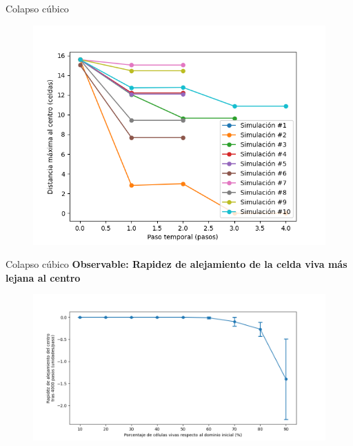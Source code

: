 \begin{frame}{Colapso cúbico}
{\begin{multicols}{3}
        {
            \begin{figure}[H]
                \centering
                \includegraphics[width=0.8\linewidth]{pic/collapse3d/distance_i90}
                \label{fig:colapso:distance:i90}
            \end{figure}
        }
    \end{multicols}
    }
\end{frame}

\begin{frame}{Colapso cúbico}
    \textbf{Observable: Rapidez de alejamiento de la celda viva más lejana al centro}
    \begin{figure}[H]
        \centering
        \includegraphics[width=0.8\linewidth]{pic/collapse3d/distance_slope_vs_input}
        \label{fig:colapso:distance_slope:density}
    \end{figure}
\end{frame}




